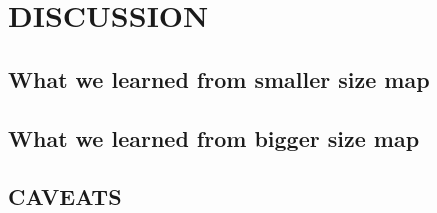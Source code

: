 
\section{DISCUSSION}
    \subsection{What we learned from smaller size map}
    \subsection{What we learned from bigger size map}
    \subsection{CAVEATS}